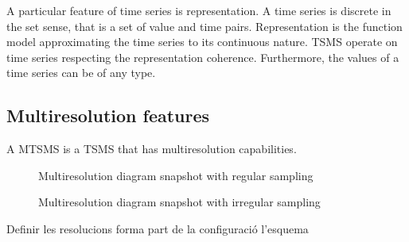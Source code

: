 A particular feature of time series is representation. A time series
is discrete in the set sense, that is a set of value and time
pairs. Representation is the function model approximating the time
series to its continuous nature. TSMS operate on time series
respecting the representation coherence. Furthermore, the values of a
time series can be of any type.





\subsection{Multiresolution features}

A MTSMS is a TSMS that has multiresolution capabilities.




\begin{figure}[tp]
  \centering
  
  \caption{Multiresolution diagram snapshot with regular sampling}
  \label{fig:mtsms:sequence}
\end{figure}


\begin{figure}[tp]
  \centering
  
  \caption{Multiresolution diagram snapshot with irregular sampling}
  \label{fig:mtsms:sequence-irregular}
\end{figure}

Definir les resolucions forma part de la configuració l'esquema



